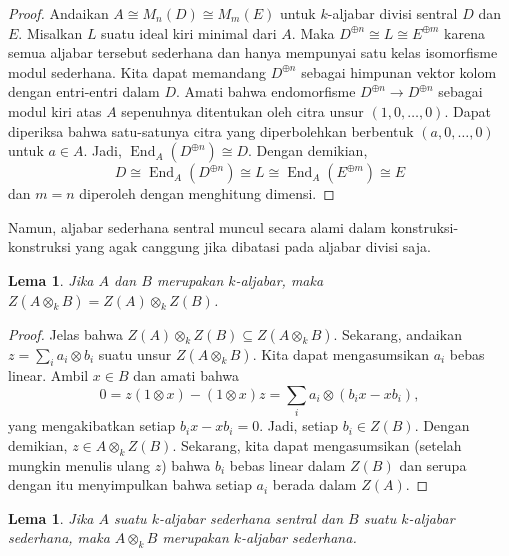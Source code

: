\documentclass[12pt]{article}
\theoremstyle{plain}
\newtheorem{lemma}[theorem]{Lema}
\theoremstyle{definition}
\theoremstyle{remark}
\numberwithin{equation}{section}
\begin{document}
\begin{proof}
Andaikan $A \cong M_n(D) \cong M_m(E)$ untuk $k$-aljabar divisi sentral
$D$ dan $E$.
Misalkan $L$ suatu ideal kiri minimal dari $A$.
Maka $D^{\oplus n} \cong L \cong E^{\oplus m}$ karena semua aljabar
tersebut sederhana dan hanya mempunyai satu kelas isomorfisme modul sederhana.
Kita dapat memandang $D^{\oplus n}$ sebagai himpunan vektor kolom dengan
entri-entri dalam $D$.
Amati bahwa endomorfisme $D^{\oplus n} \to D^{\oplus n}$
sebagai modul kiri atas $A$ sepenuhnya ditentukan oleh citra
unsur $(1,0,\ldots,0)$. Dapat diperiksa bahwa satu-satunya
citra yang diperbolehkan berbentuk $(a,0,\ldots,0)$ untuk $a \in A$.
Jadi, $\operatorname{End}_A(D^{\oplus n}) \cong D$.
Dengan demikian,
\[
D \cong \operatorname{End}_A(D^{\oplus n})
\cong L
\cong \operatorname{End}_A(E^{\oplus m}) \cong E
\]
dan $m=n$ diperoleh dengan menghitung dimensi.
\end{proof}

Namun, aljabar sederhana sentral muncul secara alami dalam konstruksi-konstruksi
yang agak canggung jika dibatasi pada aljabar divisi saja.

\begin{lemma} \label{lem:center_of_tensor}
Jika $A$ dan $B$ merupakan $k$-aljabar, maka $Z(A \otimes_k B) = Z(A) \otimes_k
Z(B)$.
\end{lemma}

\begin{proof}
Jelas bahwa $Z(A) \otimes_k Z(B) \subseteq Z(A \otimes_k B)$.
Sekarang, andaikan $z = \sum_i a_i \otimes b_i$ suatu unsur
$Z(A \otimes_k B)$. Kita dapat mengasumsikan $a_i$ bebas linear.
Ambil $x \in B$ dan amati bahwa
\[
0 = z(1 \otimes x) - (1 \otimes x)z =
\sum_i a_i \otimes (b_ix-xb_i),
\]
yang mengakibatkan setiap $b_ix-xb_i=0$.
Jadi, setiap $b_i \in Z(B)$.
Dengan demikian, $z \in A \otimes_k Z(B)$.
Sekarang, kita dapat mengasumsikan (setelah mungkin menulis ulang $z$) bahwa $b_i$
bebas linear dalam $Z(B)$
dan serupa dengan itu menyimpulkan bahwa setiap $a_i$ berada dalam $Z(A)$.
\end{proof}

\begin{lemma} \label{lem:csa_simple_simple}
Jika $A$ suatu $k$-aljabar sederhana sentral dan
$B$ suatu $k$-aljabar sederhana, maka $A \otimes_k B$ merupakan
$k$-aljabar sederhana.
\end{lemma}
\end{document}
